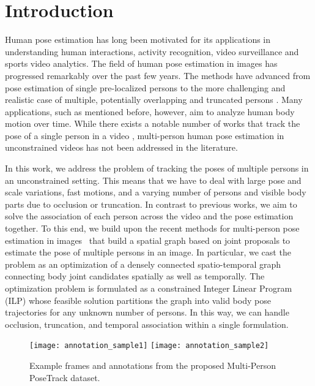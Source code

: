 \documentclass[10pt,twocolumn,letterpaper]{article}
\begin{document}
\section{Introduction}
Human pose estimation has long been motivated for its applications in understanding human interactions, activity recognition, video surveillance and sports video analytics. The field of human pose estimation in images has progressed remarkably over the past few years. The methods have advanced from pose estimation of single pre-localized persons \cite{pishchulin2016deepcut, carreira2015human, wei2016convolutional, hu2016bottom, insafutdinov2016deepercut, newell2016eccv, bulat2016human, rafi2016bmvc} to the more challenging and realistic case of multiple, potentially overlapping and truncated persons \cite{gkioxari2014using, chen2015parsing, pishchulin2016deepcut, insafutdinov2016deepercut, Iqbal_ECCVw2016}. 
Many applications, such as mentioned before, however, aim to analyze human body motion over time.     
While there exists a notable number of works that track the pose of a single person in a video \cite{park_iccv2011, cherian_cvpr2014, dong2015iccv, ramakrishna_cvpr2013, zuffi_iccv2013, jain_accv2014, Pfister15a, charles2016cvpr, georgia2016eccv, iqbal2017FG}, multi-person human pose estimation in unconstrained videos has not been addressed in the literature. 

In this work, we address the problem of tracking the poses of multiple persons in an unconstrained setting. This means that we have to deal with large pose and scale variations, fast motions, and a varying number of persons and visible body parts due to occlusion or truncation. In contrast to previous works, we aim to solve the association of each person across the video and the pose estimation together. To this end, we build upon the recent methods for multi-person pose estimation in images~\cite{pishchulin2016deepcut, insafutdinov2016deepercut, Iqbal_ECCVw2016} that build a spatial graph based on joint proposals to estimate the pose of multiple persons in an image. In particular, we cast the problem as an optimization of a densely connected spatio-temporal graph connecting body joint candidates spatially as well as temporally. The optimization problem is formulated as a constrained Integer Linear Program (ILP) whose feasible solution partitions the graph into valid body pose trajectories for any unknown number of persons. In this way, we can handle occlusion, truncation, and temporal association within a single formulation.   

\begin{figure}[t]
  \centering
    \texttt{[image: annotation\_sample1]} 
    \hfill
    \texttt{[image: annotation\_sample2]} 
  \caption{Example frames and annotations from the proposed Multi-Person PoseTrack dataset.   \vspace{-5mm}}
    \label{fig:annotation_examples}
\end{figure}
\end{document}
